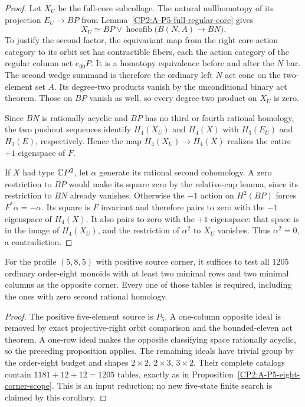 \begin{proof}
Let $X_U$ be the full-core subcollage. The natural
nullhomotopy of its projection $E_U\to BP$ from
Lemma~\ref{CP2:A-P5-full-regular-core} gives
\[
 X_U\simeq BP\vee
 \operatorname{hocofib}\bigl(B(N,A)\longrightarrow BN\bigr).
\]
To justify the second factor, the equivariant map from the
right core-action category to its orbit set has contractible
fibers, each the action category of the regular column act
$e_{00}P$. It is a homotopy equivalence before and after
the $N$ bar. The second wedge summand is therefore the
ordinary left $N$ act cone on the two-element set $A$.
Its degree-two products vanish by the unconditional binary
act theorem. Those on $BP$ vanish as well, so every
degree-two product on $X_U$ is zero.

Since $BN$ is rationally acyclic and $BP$ has no third or
fourth rational homology, the two pushout sequences identify
$H_4(X_U)$ and $H_4(X)$ with $H_3(E_U)$ and $H_3(E)$,
respectively. Hence the map $H_4(X_U)\to H_4(X)$ realizes
the entire $+1$ eigenspace of $F$.

If $X$ had type $\mathbb{C}P^2$, let $\alpha$ generate its rational
second cohomology. A zero restriction to $BP$ would make
its square zero by the relative-cup lemma, since its
restriction to $BN$ already vanishes. Otherwise the
$-1$ action on $H^2(BP)$ forces $F^*\alpha=-\alpha$.
Its square is $F$ invariant and therefore pairs to zero
with the $-1$ eigenspace of $H_4(X)$. It also pairs to zero
with the $+1$ eigenspace: that space is in the image of
$H_4(X_U)$, and the restriction of $\alpha^2$ to $X_U$
vanishes. Thus $\alpha^2=0$, a contradiction.
\end{proof}

\begin{corollary}
\label{CP2:A-P5-eight-five-scope}
For the profile $(5,8,5)$ with positive source corner, it
suffices to test all $1205$ ordinary order-eight monoids with
at least two minimal rows and two minimal columns as the
opposite corner. Every one of those tables is required,
including the ones with zero second rational homology.
\end{corollary}
\begin{proof}
The positive five-element source is $P_5$. A one-column
opposite ideal is removed by exact projective-right orbit
comparison and the bounded-eleven act theorem. A one-row
ideal makes the opposite classifying space rationally
acyclic, so the preceding proposition applies. The remaining
ideals have trivial group by the order-eight budget and
shapes $2\times2$, $2\times3$, $3\times2$. Their complete
catalogs contain $1181+12+12=1205$ tables, exactly as in
Proposition~\ref{CP2:A-P5-eight-corner-scope}. This is an
input reduction; no new five-state finite search is claimed
by this corollary.
\end{proof}

